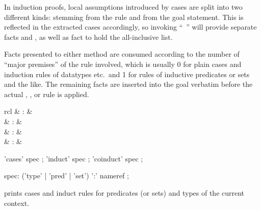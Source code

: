 \begin{isabellebody}
\begin{isamarkuptext}
  In induction proofs, local assumptions introduced by cases are split
  into two different kinds:  stemming from the rule and
   from the goal statement.  This is reflected in the
  extracted cases accordingly, so invoking ``\hyperlink{command.case}{\mbox{}}~'' will provide separate facts  and ,
  as well as fact  to hold the all-inclusive list.

  \medskip Facts presented to either method are consumed according to
  the number of ``major premises'' of the rule involved, which is
  usually 0 for plain cases and induction rules of datatypes etc.\ and
  1 for rules of inductive predicates or sets and the like.  The
  remaining facts are inserted into the goal verbatim before the
  actual , , or  rule is
  applied.%
\end{isamarkuptext}%
\isamarkuptrue%
%
\isamarkuptrue%
%
\begin{isamarkuptext}%
\begin{matharray}{rcl}
    \hypertarget{command.print_induct_rules}{\hyperlink{command.print_induct_rules}{\mbox{}}}\isa{{\isachardoublequote}\isactrlsup {\isacharasterisk}{\isachardoublequote}} & : &  \\
    \hypertarget{attribute.cases}{\hyperlink{attribute.cases}{\mbox{}}} & : & \isaratt \\
    \hypertarget{attribute.induct}{\hyperlink{attribute.induct}{\mbox{}}} & : & \isaratt \\
    \hypertarget{attribute.coinduct}{\hyperlink{attribute.coinduct}{\mbox{}}} & : & \isaratt \\
  \end{matharray}

  \begin{rail}
    'cases' spec
    ;
    'induct' spec
    ;
    'coinduct' spec
    ;

    spec: ('type' | 'pred' | 'set') ':' nameref
    ;
  \end{rail}

  \begin{descr}

  \item [\hyperlink{command.print_induct_rules}{\mbox{\isa{\isacommand{print{\isacharunderscore}induct{\isacharunderscore}rules}}}}] prints cases and induct
  rules for predicates (or sets) and types of the current context.
  

\end{descr}
\end{isamarkuptext}
\end{isabellebody}
